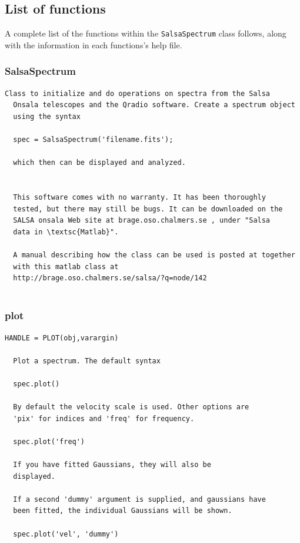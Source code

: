 \documentclass[11pt,a4paper]{article}
\begin{document}
\subsection{List of functions}
\label{sec:list-functions}

A complete list of the functions within the \texttt{SalsaSpectrum}
class follows, along with the information in each functions's help file.

\subsubsection*{SalsaSpectrum}
\label{sec:salsaspectrum}
\begin{lstlisting}[framerule=0pt]
  Class to initialize and do operations on spectra from the Salsa
  Onsala telescopes and the Qradio software. Create a spectrum object
  using the syntax
 
  spec = SalsaSpectrum('filename.fits');
 
  which then can be displayed and analyzed.
  
  
  This software comes with no warranty. It has been thoroughly
  tested, but there may still be bugs. It can be downloaded on the
  SALSA onsala Web site at brage.oso.chalmers.se , under "Salsa
  data in \textsc{Matlab}". 
  
  A manual describing how the class can be used is posted at together
  with this matlab class at
  http://brage.oso.chalmers.se/salsa/?q=node/142


\end{lstlisting}

\subsubsection*{plot}
\label{sec:plot}

\begin{lstlisting}[framerule=0pt]
  HANDLE = PLOT(obj,varargin)
  
  Plot a spectrum. The default syntax 
 
  spec.plot()
 
  By default the velocity scale is used. Other options are
  'pix' for indices and 'freq' for frequency.
 
  spec.plot('freq')
  
  If you have fitted Gaussians, they will also be
  displayed.
  
  If a second 'dummy' argument is supplied, and gaussians have
  been fitted, the individual Gaussians will be shown.
  
  spec.plot('vel', 'dummy')
\end{lstlisting}
\end{document}
